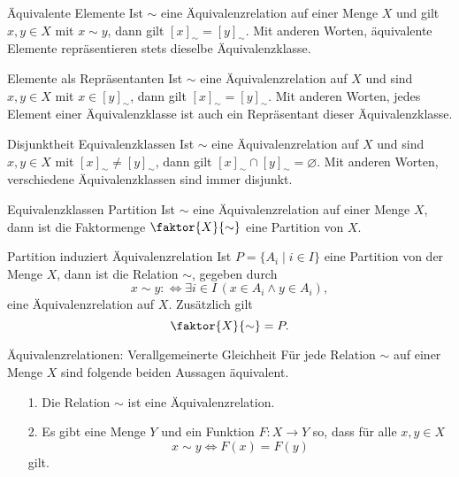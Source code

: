 \begin{lemma}{Äquivalente Elemente}
    Ist $\sim $ eine Äquivalenzrelation auf einer Menge $X$ und gilt $x,y\in X$ mit $x\sim y$, dann gilt $[x]_\sim=[y]_\sim$. Mit anderen Worten, äquivalente Elemente repräsentieren stets dieselbe Äquivalenzklasse.
\end{lemma}

\begin{corollary}{Elemente als Repräsentanten}
    Ist $\sim $ eine Äquivalenzrelation auf $X$ und sind $x,y\in X$ mit $x\in[y]_\sim$, dann gilt $[x]_\sim=[y]_\sim$. Mit anderen Worten, jedes Element einer Äquivalenzklasse ist auch ein Repräsentant dieser Äquivalenzklasse.
\end{corollary}

\begin{lemma}{Disjunktheit Equivalenzklassen}
    Ist $\sim $ eine Äquivalenzrelation auf $X$ und sind $x,y\in X$ mit $[x]_\sim\neq[y]_\sim$, dann gilt $[x]_\sim\cap[y]_\sim=\varnothing$.
    Mit anderen Worten, verschiedene Äquivalenzklassen sind immer disjunkt.
\end{lemma}

\begin{lemma}{Equivalenzklassen Partition}
    Ist $\sim$ eine Äquivalenzrelation auf einer Menge $X$, dann ist die Faktormenge $\faktor{X}{\sim}$ eine Partition von $X$.
\end{lemma}

\begin{lemma}{Partition induziert Äquivalenzrelation}
    Ist $P=\{A_i\mid i\in I\}$ eine Partition von der Menge $X$, dann ist die Relation $\sim$, gegeben durch
    \[
        x\sim y:\Leftrightarrow \exists i\in I\,(x\in A_i\land y\in A_i),
    \]
    eine Äquivalenzrelation auf $X$. Zusätzlich gilt
    \[
        \faktor{X}{\sim}=P.
    \]
\end{lemma}

\begin{lemma}{Äquivalenzrelationen: Verallgemeinerte Gleichheit}
    Für jede Relation $\sim$ auf einer Menge $X$ sind folgende beiden Aussagen äquivalent.
    \begin{enumerate}
        \item[1.] Die Relation $\sim$ ist eine Äquivalenzrelation.
        \item[2.] Es gibt eine Menge $Y$ und ein Funktion $F:X\to Y$ so, dass für alle $x,y\in X$
            \[
                x\sim y\Leftrightarrow F(x)=F(y)
            \]
            gilt.
    \end{enumerate}
\end{lemma}

